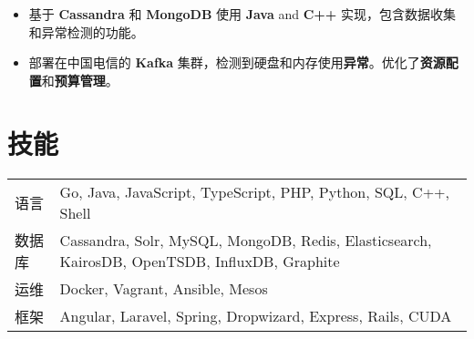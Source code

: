 \documentclass[11pt, letterpaper]{simple-cv}
\begin{document}

\begin{itemize}
  \item 基于 \textbf{Cassandra} 和 \textbf{MongoDB} 使用 \textbf{Java} and \textbf{C++} 实现，包含数据收集和异常检测的功能。
  \item 部署在中国电信的 \textbf{Kafka} 集群，检测到硬盘和内存使用\textbf{异常}。优化了\textbf{资源配置}和\textbf{预算管理}。
\end{itemize}

\section{技能}
\begin{tabular}{ l l }
 语言 &  Go, Java, JavaScript, TypeScript, PHP, Python, SQL, C++, Shell\\
 数据库 & Cassandra, Solr, MySQL, MongoDB, Redis, Elasticsearch, KairosDB, OpenTSDB, InfluxDB, Graphite\\
 运维 & Docker, Vagrant, Ansible, Mesos\\
 框架 & Angular, Laravel, Spring, Dropwizard, Express, Rails, CUDA
\end{tabular}
\end{document}
